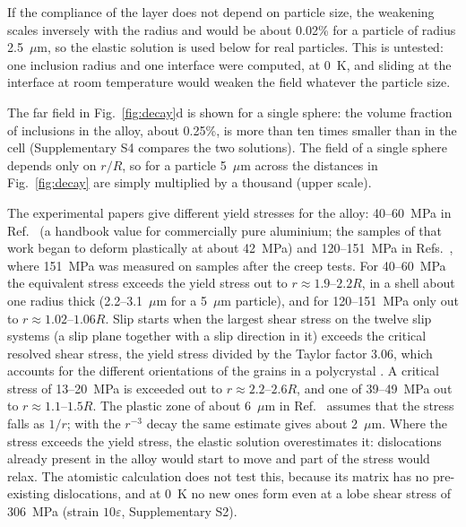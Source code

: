 \documentclass[11pt,a4paper]{article}
\begin{document}
If the compliance of the layer does not depend on particle size, the
weakening scales inversely with the radius and would be about 0.02\% for
a particle of radius 2.5~$\mu$m, so the elastic solution is used below for
real particles. This is untested: one inclusion radius and one interface were
computed, at 0~K, and sliding at the interface at room temperature would
weaken the field whatever the particle size.

The far field in Fig.~\ref{fig:decay}d is shown for a single sphere: the
volume fraction of inclusions in the alloy, about 0.25\%, is more than ten
times smaller than in the cell (Supplementary S4 compares the two
solutions). The field of a single sphere depends only on $r/R$, so for a
particle 5~$\mu$m across the distances in Fig.~\ref{fig:decay} are simply
multiplied by a thousand (upper scale).

The experimental papers give different yield stresses for the alloy:
40--60~MPa in Ref.~\cite{Friha2024JMMM} (a handbook value for commercially
pure aluminium; the samples of that work began to deform plastically at
about 42~MPa) and 120--151~MPa in Refs.~\cite{Skvortsov2019JAP,Pshonkin2025ZL},
where 151~MPa was measured on samples after the creep tests. For
40--60~MPa the equivalent stress exceeds the yield stress out to
$r\approx\text{1.9--2.2}R$, in a shell about one radius thick
(2.2--3.1~$\mu$m for a 5~$\mu$m particle), and for
120--151~MPa only out to $r\approx\text{1.02--1.06}R$. Slip starts
when the largest shear stress on the twelve slip systems (a slip plane
together with a slip direction in it) exceeds the critical resolved shear
stress, the yield stress divided by the Taylor factor 3.06, which accounts
for the different orientations of the grains in a polycrystal
\cite{StollerZinkle2000}. A critical stress of 13--20~MPa is exceeded
out to $r\approx\text{2.2--2.6}R$, and one of 39--49~MPa out
to $r\approx\text{1.1--1.5}R$. The plastic zone of about
6~$\mu$m in Ref.~\cite{Skvortsov2019JAP} assumes that the stress falls as
$1/r$; with the $r^{-3}$ decay the same estimate gives about 2~$\mu$m.
Where the stress exceeds the yield stress, the elastic solution
overestimates it: dislocations already present in the alloy would start to
move and part of the stress would relax. The atomistic calculation does not
test this, because its matrix has no pre-existing dislocations, and at 0~K
no new ones form even at a lobe shear stress of 306~MPa (strain
$10\varepsilon$, Supplementary S2).
\end{document}
